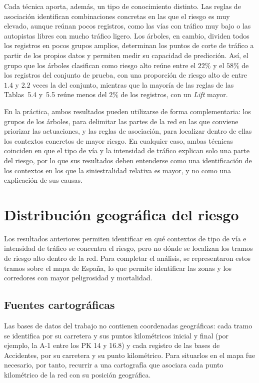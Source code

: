 \documentclass[twoside,a4paper,12pt,onecolumn,openany]{book}
\begin{document}
Cada técnica aporta, además, un tipo de conocimiento distinto. Las reglas de asociación identifican combinaciones concretas en las que el riesgo es muy elevado, aunque reúnan pocos registros, como las vías con tráfico muy bajo o las autopistas libres con mucho tráfico ligero. Los árboles, en cambio, dividen todos los registros en pocos grupos amplios, determinan los puntos de corte de tráfico a partir de los propios datos y permiten medir su capacidad de predicción. Así, el grupo que los árboles clasifican como riesgo alto reúne entre el $22\%$ y el $58\%$ de los registros del conjunto de prueba, con una proporción de riesgo alto de entre $1.4$ y $2.2$ veces la del conjunto, mientras que la mayoría de las reglas de las Tablas~5.4 y~5.5 reúne menos del $2\%$ de los registros, con un \textit{Lift} mayor.
 
\vspace{0.5cm}
 
En la práctica, ambos resultados pueden utilizarse de forma complementaria: los grupos de los árboles, para delimitar las partes de la red en las que conviene priorizar las actuaciones, y las reglas de asociación, para localizar dentro de ellas los contextos concretos de mayor riesgo. En cualquier caso, ambas técnicas coinciden en que el tipo de vía y la intensidad de tráfico explican solo una parte del riesgo, por lo que sus resultados deben entenderse como una identificación de los contextos en los que la siniestralidad relativa es mayor, y no como una explicación de sus causas.

\section{Distribución geográfica del riesgo}
 
Los resultados anteriores permiten identificar en qué contextos de tipo de vía e intensidad de tráfico se concentra el riesgo, pero no dónde se localizan los tramos de riesgo alto dentro de la red. Para completar el análisis, se representaron estos tramos sobre el mapa de España, lo que permite identificar las zonas y los corredores con mayor peligrosidad y mortalidad.
 
\subsection{Fuentes cartográficas}
 
Las bases de datos del trabajo no contienen coordenadas geográficas: cada tramo se identifica por su carretera y sus puntos kilométricos inicial y final (por ejemplo, la A-1 entre los PK 14 y 16.8) y cada registro de las bases de Accidentes, por su carretera y su punto kilométrico. Para situarlos en el mapa fue necesario, por tanto, recurrir a una cartografía que asociara cada punto kilométrico de la red con su posición geográfica.
 
\end{document}
